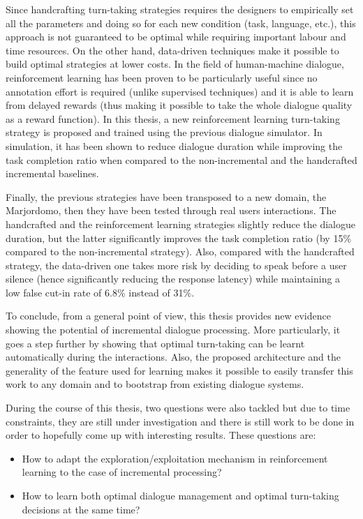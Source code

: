         Since handcrafting turn-taking strategies requires the designers to empirically set all the parameters and doing so for each new condition (task, language, etc.), this approach is not guaranteed to be optimal while requiring important labour and time resources. On the other hand, data-driven techniques make it possible to build optimal strategies at lower costs. In the field of human-machine dialogue, reinforcement learning has been proven to be particularly useful since no annotation effort is required (unlike supervised techniques) and it is able to learn from delayed rewards (thus making it possible to take the whole dialogue quality as a reward function). In this thesis, a new reinforcement learning turn-taking strategy is proposed and trained using the previous dialogue simulator. In simulation, it has been shown to reduce dialogue duration while improving the task completion ratio when compared to the non-incremental and the handcrafted incremental baselines.

        Finally, the previous strategies have been transposed to a new domain, the Marjordomo, then they have been tested through real users interactions. The handcrafted and the reinforcement learning strategies slightly reduce the dialogue duration, but the latter significantly improves the task completion ratio (by 15\% compared to the non-incremental strategy). Also, compared with the handcrafted strategy, the data-driven one takes more risk by deciding to speak before a user silence (hence significantly reducing the response latency) while maintaining a low false cut-in rate of 6.8\% instead of 31\%.

        To conclude, from a general point of view, this thesis provides new evidence showing the potential of incremental dialogue processing. More particularly, it goes a step further by showing that optimal turn-taking can be learnt automatically during the interactions. Also, the proposed architecture and the generality of the feature used for learning makes it possible to easily transfer this work to any domain and to bootstrap from existing dialogue systems.
        
        During the course of this thesis, two questions were also tackled but due to time constraints, they are still under investigation and there is still work to be done in order to hopefully come up with interesting results. These questions are:

        \begin{itemize}
          \item How to adapt the exploration/exploitation mechanism in reinforcement learning to the case of incremental processing?
          \item How to learn both optimal dialogue management and optimal turn-taking decisions at the same time?
        \end{itemize}

